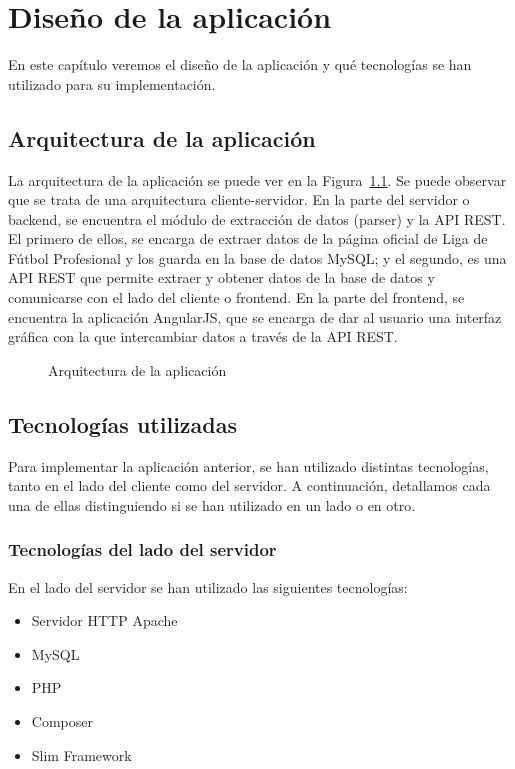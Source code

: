 \chapter{Diseño de la aplicación}

En este capítulo veremos el diseño de la aplicación y qué tecnologías se han utilizado para su implementación. 

\section{Arquitectura de la aplicación}

La arquitectura de la aplicación se puede ver en la Figura~\ref{fig:arquitectura}. Se puede observar que se trata de una arquitectura cliente-servidor. En la parte del servidor o backend, se encuentra el módulo de extracción de datos (parser) y la API REST. El primero de ellos, se encarga de extraer datos de la página oficial de Liga de Fútbol Profesional y los guarda en la base de datos MySQL; y el segundo, es una API REST que permite extraer y obtener datos de la base de datos y comunicarse con el lado del cliente o frontend. En la parte del frontend, se encuentra la aplicación AngularJS, que se encarga de dar al usuario una interfaz gráfica con la que intercambiar datos a través de la API REST.  

\begin{figure}[htb]
\centering
\arquitectura
\caption{Arquitectura de la aplicación}
\label{fig:arquitectura}
\end{figure}

\section{Tecnologías utilizadas}

Para implementar la aplicación anterior, se han utilizado distintas tecnologías, tanto en el lado del cliente como del servidor. A continuación, detallamos cada una de ellas distinguiendo si se han utilizado en un lado o en otro.

\subsection{Tecnologías del lado del servidor}

En el lado del servidor se han utilizado las siguientes tecnologías:

\begin{itemize}
\item Servidor HTTP Apache
\item MySQL
\item PHP
\item Composer
\item Slim Framework
\end{itemize}

